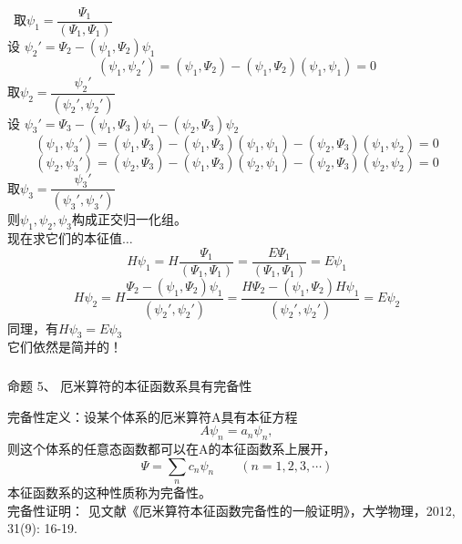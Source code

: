 \begin{frame} [allowframebreaks=]
    \frametitle{}
    \解~取$\psi_1=\dfrac{\Psi_1}{(\Psi_1, \Psi_1)}$\\
    设 $\psi_2'=\Psi_2-(\psi_1, \Psi_2)\psi_1$\\
    \begin{equation*}
        (\psi_1, \psi_2')=(\psi_1, \Psi_2)-(\psi_1, \Psi_2)(\psi_1, \psi_1)=0
    \end{equation*}  
    取$\psi_2=\dfrac{\psi_2'}{(\psi_2', \psi_2')}$\\
    设 $\psi_3'=\Psi_3-(\psi_1, \Psi_3)\psi_1-(\psi_2, \Psi_3)\psi_2$\\
    \begin{equation*}
        (\psi_1, \psi_3')=(\psi_1, \Psi_3)-(\psi_1, \Psi_3)(\psi_1, \psi_1)-(\psi_2, \Psi_3)(\psi_1, \psi_2)=0
    \end{equation*}
    \begin{equation*}
        (\psi_2, \psi_3')=(\psi_2, \Psi_3)-(\psi_1, \Psi_3)(\psi_2, \psi_1)-(\psi_2, \Psi_3)(\psi_2, \psi_2)=0
    \end{equation*}
    取$\psi_3=\dfrac{\psi_3'}{(\psi_3', \psi_3')}$\\
    则$\psi_1, \psi_2, \psi_3$构成正交归一化组。\\ \vspace{0.6em}
    现在求它们的本征值$\dots$\\
    $$ H\psi_1= H \dfrac{\Psi_1}{(\Psi_1, \Psi_1)} =  \dfrac{E\Psi_1}{(\Psi_1, \Psi_1)} = E \psi_1$$
    $$ H\psi_2= H \dfrac{\Psi_2-(\psi_1, \Psi_2)\psi_1}{(\psi_2', \psi_2')} =  \dfrac{H\Psi_2-(\psi_1, \Psi_2)H\psi_1}{(\psi_2', \psi_2')}=E\psi_2$$
    同理，有$ H\psi_3=E\psi_3$\\
    它们依然是简并的！
\end{frame} 

\begin{frame} [allowframebreaks=]
    \frametitle{}
    \begin{tcolorbox1}{命题 5、}
        厄米算符的本征函数系具有完备性
     \end{tcolorbox1}
    \alert{完备性定义：}设某个体系的厄米算符A具有本征方程
    \begin{equation*}
        A\psi_{n}=a_n\psi_{n}, 
    \end{equation*}  
    则这个体系的任意态函数都可以在A的本征函数系上展开，
    \begin{equation*}
        \Psi=\sum_n c_n \psi_{n} \qquad (n=1,2,3,\cdots)
    \end{equation*}
    本征函数系的这种性质称为完备性。\\
    完备性证明： 见文献《厄米算符本征函数完备性的一般证明》，大学物理，2012, 31(9): 16-19.
\end{frame} 

